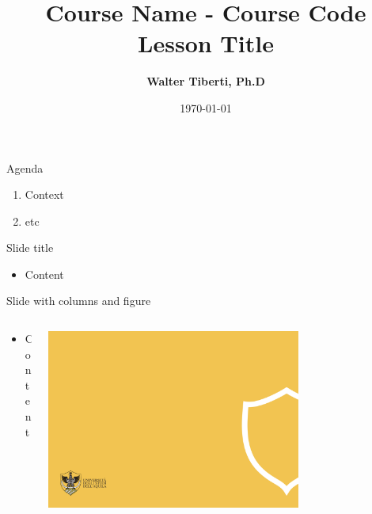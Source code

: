 \documentclass{univaqslides}
\author{\textbf{Walter Tiberti, Ph.D}}
\date{\today}
\title{
	\color{black}
	\huge Course Name - Course Code\\
	\vspace{1cm}
	\textbf{Lesson Title}
	\vspace{1em}
}
\begin{document}
	\univaqtitlepage
	
	\begin{frame}{Agenda}
		\begin{enumerate}
			\item Context
			\item etc
		\end{enumerate}
	\end{frame}
	
	\begin{frame}{Slide title}
	\begin{itemize}
		\item Content
	\end{itemize}
	\end{frame}


	\begin{frame}{Slide with columns and figure}
		\begin{columns}
			\begin{column}{0.5\textwidth}
				\begin{itemize}
					\item Content
				\end{itemize}
			\end{column}
			\begin{column}{0.5\textwidth}
				\includegraphics[width=0.7\textwidth]{logos/back43.png}
			\end{column}
		\end{columns}
	\end{frame}
\end{document}
